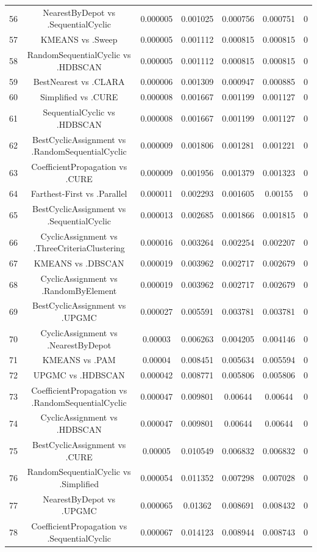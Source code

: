\documentclass[a4paper,10pt]{article}
\begin{document}
\begin{landscape}
\begin{table}[!htp]
\begin{tabular}{ccccccc}
56&NearestByDepot vs .SequentialCyclic&0.000005&0.001025&0.000756&0.000751&0\\
57&KMEANS vs .Sweep&0.000005&0.001112&0.000815&0.000815&0\\
58&RandomSequentialCyclic vs .HDBSCAN&0.000005&0.001112&0.000815&0.000815&0\\
59&BestNearest vs .CLARA&0.000006&0.001309&0.000947&0.000885&0\\
60&Simplified vs .CURE&0.000008&0.001667&0.001199&0.001127&0\\
61&SequentialCyclic vs .HDBSCAN&0.000008&0.001667&0.001199&0.001127&0\\
62&BestCyclicAssignment vs .RandomSequentialCyclic&0.000009&0.001806&0.001281&0.001221&0\\
63&CoefficientPropagation vs .CURE&0.000009&0.001956&0.001379&0.001323&0\\
64&Farthest-First vs .Parallel&0.000011&0.002293&0.001605&0.00155&0\\
65&BestCyclicAssignment vs .SequentialCyclic&0.000013&0.002685&0.001866&0.001815&0\\
66&CyclicAssignment vs .ThreeCriteriaClustering&0.000016&0.003264&0.002254&0.002207&0\\
67&KMEANS vs .DBSCAN&0.000019&0.003962&0.002717&0.002679&0\\
68&CyclicAssignment vs .RandomByElement&0.000019&0.003962&0.002717&0.002679&0\\
69&BestCyclicAssignment vs .UPGMC&0.000027&0.005591&0.003781&0.003781&0\\
70&CyclicAssignment vs .NearestByDepot&0.00003&0.006263&0.004205&0.004146&0\\
71&KMEANS vs .PAM&0.00004&0.008451&0.005634&0.005594&0\\
72&UPGMC vs .HDBSCAN&0.000042&0.008771&0.005806&0.005806&0\\
73&CoefficientPropagation vs .RandomSequentialCyclic&0.000047&0.009801&0.00644&0.00644&0\\
74&CyclicAssignment vs .HDBSCAN&0.000047&0.009801&0.00644&0.00644&0\\
75&BestCyclicAssignment vs .CURE&0.00005&0.010549&0.006832&0.006832&0\\
76&RandomSequentialCyclic vs .Simplified&0.000054&0.011352&0.007298&0.007028&0\\
77&NearestByDepot vs .UPGMC&0.000065&0.01362&0.008691&0.008432&0\\
78&CoefficientPropagation vs .SequentialCyclic&0.000067&0.014123&0.008944&0.008743&0\\

\end{tabular}
\end{table}
\end{landscape}
\end{document}
